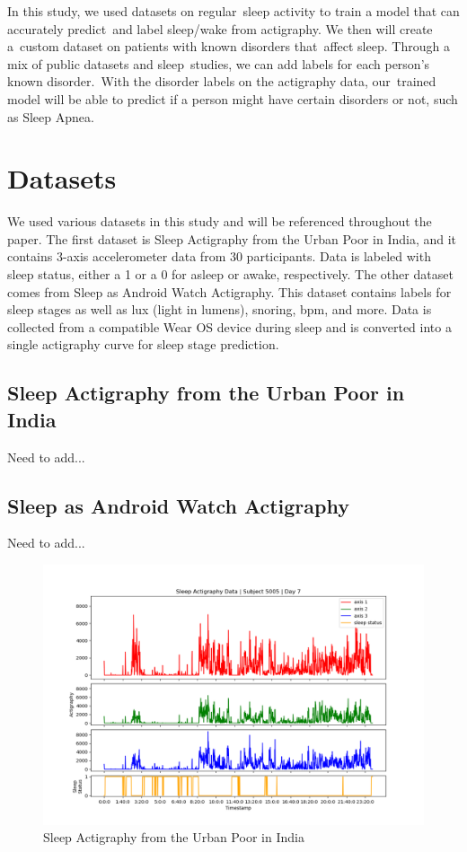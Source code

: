 \documentclass[12pt]{report}
\begin{document}
In this study, we used datasets on regular sleep activity to train a model that can accurately predict and label sleep/wake from actigraphy. We then will create a custom dataset on patients with known disorders that affect sleep. Through a mix of public datasets and sleep studies, we can add labels for each person's known disorder. With the disorder labels on the actigraphy data, our trained model will be able to predict if a person might have certain disorders or not, such as Sleep Apnea.

\pagebreak

\section{Datasets}

We used various datasets in this study and will be referenced throughout the paper. The first dataset is Sleep Actigraphy from the Urban Poor in India, and it contains 3-axis accelerometer data from 30 participants. Data is labeled with sleep status, either a 1 or a 0 for asleep or awake, respectively. The other dataset comes from Sleep as Android Watch Actigraphy. This dataset contains labels for sleep stages as well as lux (light in lumens), snoring, bpm, and more. Data is collected from a compatible Wear OS device during sleep and is converted into a single actigraphy curve for sleep stage prediction.

\subsection{Sleep Actigraphy from the Urban Poor in India}
Need to add...

\subsection{Sleep as Android Watch Actigraphy}
Need to add...

\pagebreak

\begin{figure}
  \begin{center}
    \includegraphics[width=1\linewidth]{model_test_subject5005_day7}
    \caption{Sleep Actigraphy from the Urban Poor in India\cite{zhang}\cite{bessone}}
    \label{urban-poor}
  \end{center}
\end{figure}
\end{document}
